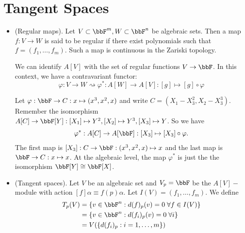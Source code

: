 \section{Tangent Spaces}
\begin{itemize}
    \item(Regular maps).
    Let $V\subset\bbF^m, W\subset\bbF^n$ be algebraic sets. 
    Then a map $f:V\to W$ is said to be regular if there exist polynomials such that 
    $f=(f_1,\dots,f_m)$. Such a map is continuous in the Zariski topology. 
    \begin{remark}
        We can identify $A[V]$ with the set of regular functions $V\to\bbF$. In this 
        context, we have a contravariant functor:
        \begin{equation}
            \varphi: V\to W \rightsquigarrow \varphi^*:A[W]\to A[V]: [g]\mapsto [g]\circ\varphi
        \end{equation}
    \end{remark}
  \begin{example}
    Let $\varphi:\bbF\to C:x\mapsto (x^3,x^2,x)$ and write $C=(X_1-X_3^2,X_2-X_3^3)$. Remember the isomorphism
    $A[C]\to \bbF[Y]: [X_1]\mapsto Y^2,[X_2]\mapsto Y^3,[X_3]\mapsto Y$. So we have 
    \begin{equation}
        \varphi^*:A[C]\to A[\bbF]:[X_3]\mapsto [X_3]\circ\varphi. 
    \end{equation}
    The first map is $[X_3]:C\to \bbF:(x^3,x^2,x)\mapsto x$ and the last map is $\bbF\to C:x\mapsto x$. 
    At the algebraic level, the map $\varphi^*$ is just the the isomorphism $\bbF[Y]\cong\bbF[X]$.
  \end{example}
  \item(Tangent spaces). Let $V$ be an algebraic set and 
  $V_p = \bbF$ be the $A[V]-$module with action $[f]\alpha\equiv f(p)\alpha$. Let 
  $I(V) = (f_1,\dots, f_m)$. We define 
  \begin{equation}
    \begin{split}
        T_p(V) &= \{v\in\bbF^n: d(f)_p(v)=0\;\forall f\in I(V)\}\\
           &=\{v\in\bbF^n: d(f_i)_p(v)=0\;\forall i\}\\
           &=V(\{d(f_i)_p:i=1,\dots,m\})
    \end{split}
  \end{equation}


\end{itemize}
